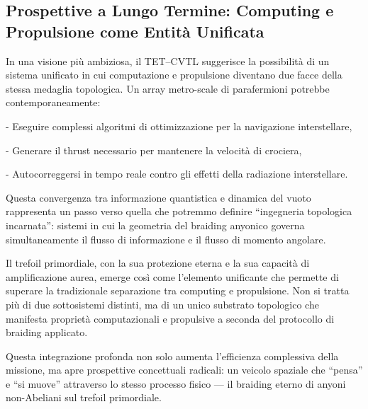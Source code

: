 \documentclass[11pt,a4paper]{article}
\theoremstyle{plain}
\theoremstyle{definition}
\begin{document}
\subsection{Prospettive a Lungo Termine: Computing e Propulsione come Entità Unificata}


\vspace{0.2cm}

In una visione più ambiziosa, il TET--CVTL suggerisce la possibilità di un sistema unificato in cui computazione e propulsione diventano due facce della stessa medaglia topologica. Un array metro-scale di parafermioni potrebbe contemporaneamente:


\vspace{0.1cm}
- Eseguire complessi algoritmi di ottimizzazione per la navigazione interstellare,

\vspace{0.1cm}
- Generare il thrust necessario per mantenere la velocità di crociera,

\vspace{0.1cm}
- Autocorreggersi in tempo reale contro gli effetti della radiazione interstellare.

\vspace{0.2cm}

Questa convergenza tra informazione quantistica e dinamica del vuoto rappresenta un passo verso quella che potremmo definire “ingegneria topologica incarnata”: sistemi in cui la geometria del braiding anyonico governa simultaneamente il flusso di informazione e il flusso di momento angolare.

\vspace{0.4cm}

Il trefoil primordiale, con la sua protezione eterna e la sua capacità di amplificazione aurea, emerge così come l’elemento unificante che permette di superare la tradizionale separazione tra computing e propulsione. Non si tratta più di due sottosistemi distinti, ma di un unico substrato topologico che manifesta proprietà computazionali e propulsive a seconda del protocollo di braiding applicato.

\vspace{0.2cm}

Questa integrazione profonda non solo aumenta l’efficienza complessiva della missione, ma apre prospettive concettuali radicali: un veicolo spaziale che “pensa” e “si muove” attraverso lo stesso processo fisico — il braiding eterno di anyoni non-Abeliani sul trefoil primordiale.

\vspace{0.2cm}
\end{document}
